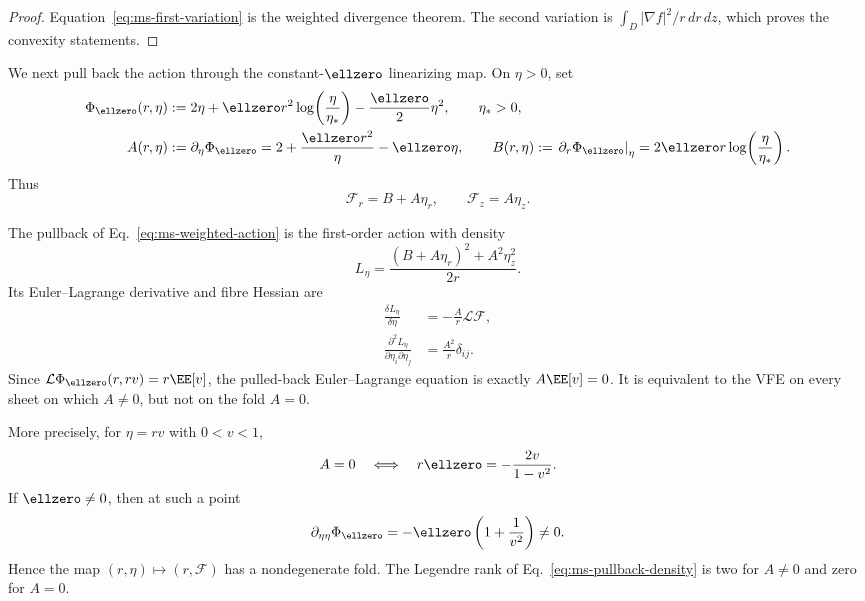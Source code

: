 \begin{proof}
Equation~\eqref{eq:ms-first-variation} is the weighted divergence theorem.
The second variation is $\int_D|\nabla f|^2/r\,dr\,dz$, which proves the
convexity statements.
\end{proof}

We next pull back the action through the constant-$\ellzero$ linearizing
map. On $\eta>0$, set
\begin{align}
\Phi_{\ellzero}(r,\eta)
&:=2\eta+\ellzero r^2\log\!\left(\frac{\eta}{\eta_*}\right)
-\frac{\ellzero}{2}\eta^2,
\qquad \eta_*>0,
\label{eq:ms-Phi-definition}\\
A(r,\eta)
&:=\partial_\eta\Phi_{\ellzero}
=2+\frac{\ellzero r^2}{\eta}-\ellzero\eta,
\qquad
B(r,\eta)
:=\left.\partial_r\Phi_{\ellzero}\right|_\eta
=2\ellzero r\log\!\left(\frac{\eta}{\eta_*}\right).
\label{eq:ms-A-B-definition}
\end{align}
Thus
\begin{equation}
\mathcal F_r=B+A\eta_r,
\qquad
\mathcal F_z=A\eta_z.
\label{eq:ms-Phi-total-derivatives}
\end{equation}

\begin{theorem}
\label{thm:ms-pullback-fold}
The pullback of Eq.~\eqref{eq:ms-weighted-action} is the first-order action
with density
\begin{equation}
L_\eta
=\frac{(B+A\eta_r)^2+A^2\eta_z^2}{2r}.
\label{eq:ms-pullback-density}
\end{equation}
Its Euler--Lagrange derivative and fibre Hessian are
\begin{align}
\frac{\delta L_\eta}{\delta\eta}
&=-\frac{A}{r}\mathcal L\mathcal F,
\label{eq:ms-pullback-EL}\\
\frac{\partial^2L_\eta}{\partial\eta_i\partial\eta_j}
&=\frac{A^2}{r}\delta_{ij}.
\label{eq:ms-pullback-Hessian}
\end{align}
Since $\mathcal L\Phi_{\ellzero}(r,rv)=r\EE[v]$, the pulled-back
Euler--Lagrange equation is exactly $A\EE[v]=0$. It is equivalent to the VFE
on every sheet on which $A\neq0$, but not on the fold $A=0$.

More precisely, for $\eta=rv$ with $0<v<1$,
\begin{equation}
A=0
\quad\Longleftrightarrow\quad
r\ellzero=-\frac{2v}{1-v^2}.
\label{eq:ms-fold-density-root}
\end{equation}
If $\ellzero\neq0$, then at such a point
\begin{equation}
\partial_{\eta\eta}\Phi_{\ellzero}
=-\ellzero\left(1+\frac{1}{v^2}\right)\neq0.
\label{eq:ms-fold-second-derivative}
\end{equation}
Hence the map $(r,\eta)\mapsto(r,\mathcal F)$ has a nondegenerate fold.
The Legendre rank of Eq.~\eqref{eq:ms-pullback-density} is two for $A\neq0$
and zero for $A=0$.
\end{theorem}


